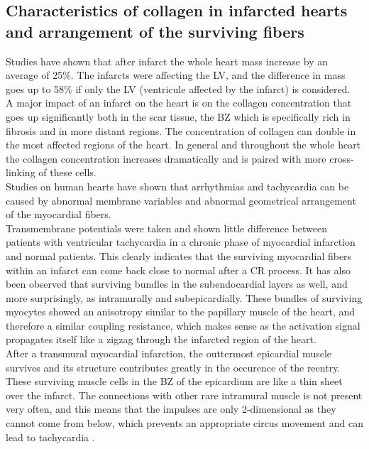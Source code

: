 \subsection{Characteristics of collagen in infarcted hearts and arrangement of the surviving fibers} \label{surviving_fibers}

Studies \cite{mccormick1994regional} have shown that after infarct the whole heart mass increase by an average of 25\%. The infarcts were affecting the LV, and the difference in mass goes up to 58\% if only the LV (ventricule affected by the infarct) is considered.\\
A major impact of an infarct on the heart is on the collagen concentration that goes up significantly both in the scar tissue, the BZ which is specifically rich in fibrosis and in more distant regions. The concentration of collagen can double in the most affected regions of the heart. In general and throughout the whole heart the collagen concentration increases dramatically and is paired with more cross-linking of these cells.\\
Studies on human hearts \cite{de1990ventricular} have shown that arrhythmias and tachycardia can be caused by abnormal membrane variables and abnormal geometrical arrangement of the myocardial fibers.\\
Transmembrane potentials were taken and shown little difference between patients with ventricular tachycardia in a chronic phase of myocardial infarction and normal patients. This clearly indicates that the surviving myocardial fibers within an infarct can come back close to normal after a CR process. It has also been observed that surviving bundles in the subendocardial layers as well, and more surprisingly, as intramurally and subepicardially. These bundles of surviving myocytes showed an anisotropy similar to the papillary muscle of the heart, and therefore a similar coupling resistance, which makes sense as the activation signal propagates itself like a zigzag through the infarcted region of the heart.\\
After a transmural myocardial infarction, the outtermost epicardial muscle survives and its structure contributes greatly in the occurence of the reentry. These surviving muscle cells in the BZ of the epicardium are like a thin sheet over the infarct. The connections with other rare intramural muscle is not present very often, and this means that the impulses are only 2-dimensional as they cannot come from below, which prevents an appropriate circus movement and can lead to tachycardia \cite{ursell1985structural}.
